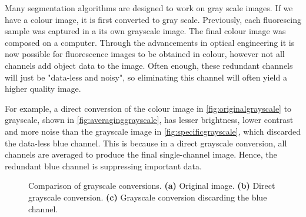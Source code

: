 \begin{definition}
	Many segmentation algorithms are designed to work on gray scale images. If we have a colour image, it is first converted to gray scale. Previously, each fluorescing sample was captured in a its own grayscale image. The final colour image was composed on a computer. Through the advancements in optical engineering it is now possible for fluorescence images to be obtained in colour, however not all channels add object data to the image.
	Often enough, these redundant channels will just be "data-less and noisy", so eliminating this channel will often yield a higher quality image.
	
	For example, a direct conversion of the colour image in \ref{fig:originalgrayscale} to grayscale, shown in \ref{fig:averaginggrayscale}, has lesser brightness, lower contrast and more noise than the grayscale image in \ref{fig:specificgrayscale}, which discarded the data-less blue channel. This is because in a direct grayscale conversion, all channels are averaged to produce the final single-channel image. Hence, the redundant blue channel is suppressing important data.
	
	\begin{figure}[!t]
		\centering
		\caption{Comparison of grayscale conversions. \textbf{(a)} Original image. \textbf{(b)} Direct grayscale conversion. \textbf{(c)} Grayscale conversion discarding the blue channel.}
		\label{fig:grayscaleconversion}
	\end{figure}
\end{definition}

